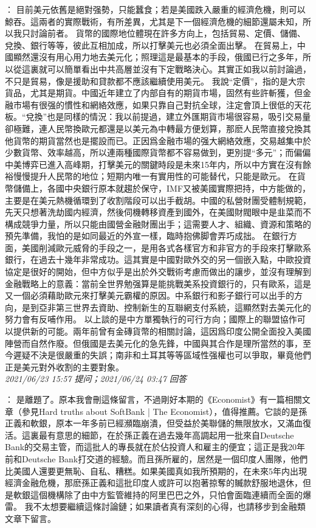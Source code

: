 \documentclass[twocolumn]{ctexart}
\begin{document}
：
目前美元依舊是絕對强勢，只能蠶食；若是美國跌入嚴重的經濟危機，則可以鯨吞。這兩者的實際戰術，有所差異，尤其是下一個經濟危機的細節還屬未知，所以我只討論前者。
貨幣的國際地位體現在許多方向上，包括貿易、定價、儲備、兌換、銀行等等，彼此互相加成，所以打擊美元也必須全面出擊。
在貿易上，中國顯然還沒有用心用力地去美元化；照理這是最基本的手段，俄國已行之多年，所以從這裏就可以簡單看出中共高層並沒有下定戰略決心。其實正如我以前討論過，不只是貿易，像是援助和貸款都不應該繼續使用美元。
我說“定價”，指的是大宗貨品，尤其是期貨。中國近年建立了内部自有的期貨市場，固然有些許斬獲，但金融市場有很强的慣性和網絡效應，如果只靠自己對抗全球，注定會頂上很低的天花板。“兌換”也是同樣的情況：我以前提過，建立外匯期貨市場很容易，吸引交易量卻極難，連人民幣換歐元都還是以美元為中轉最方便划算，那麽人民幣直接兌換其他貨幣的期貨當然也是擺設而已。正因爲金融市場的强大網絡效應，交易越集中於少數貨幣、效率越高，所以連兩種國際貨幣都不容易做到，更別提“多元”；而偏偏中美博弈已進入高峰期，打擊美元的關鍵時段是未來15年内，所以中方實在沒有餘裕慢慢提升人民幣的地位；短期内唯一有實用性的可能替代，只能是歐元。
在貨幣儲備上，各國中央銀行原本就趨於保守，IMF又被美國實際把持，中方能做的，主要是在美元熱機循環到了收割階段可以出手截胡。中國的私營財團受體制規範，先天只想著洗劫國内經濟，然後伺機轉移資產到國外，在美國財閥眼中是韭菜而不構成競爭力量，所以只能由國營金融財團出手；這需要人才、組織、資源和策略的預先準備，我怕的是如同最近的外宣一樣，臨時抱佛脚會弄巧成拙。
在銀行方面，美國削減歐元威脅的手段之一，是用各式各樣官方和非官方的手段來打擊歐系銀行，在過去十幾年非常成功。這其實是中國對歐外交的另一個嵌入點，中歐投資協定是很好的開始，但中方似乎是出於外交戰術考慮而做出的讓步，並沒有理解到金融戰略上的意義：當前全世界勉强算是能挑戰美系投資銀行的，只有歐系，這是又一個必須藉助歐元來打擊美元霸權的原因。中系銀行和影子銀行可以出手的方向，是到亞非第三世界去資助、控制新生的互聯網支付系統，這顯然對去美元化的努力會有反哺作用。
以上談的是中方單獨執行的可行方向；國際上的聯盟協作可以提供新的可能。兩年前曾有金磚貨幣的相關討論，這因爲印度公開全面投入美國陣營而自然作廢。但俄國是去美元化的急先鋒，中國與其合作是理所當然的事，至今遲疑不決是很嚴重的失誤；南非和土耳其等等區域性强權也可以爭取，畢竟他們正是美元對外收割的主要對象。
\\

\textit{\hfill\noindent\small 2021/06/23 15:57 提问；2021/06/24 03:47 回答}

：
是離題了。原本我會刪這條留言，不過剛好本期的《Economist》有一篇相關文章（參見Hard truths about SoftBank | The Economist），值得推薦。它談的是孫正義和軟銀，原本一年多前已經瀕臨崩潰，但受益於美聯儲的無限放水，又滿血復活。這裏最有意思的細節，在於孫正義在過去幾年高調起用一批來自Deutsche Bank的交易主管，而這批人的專長就在於佔投資人和雇主的便宜；這正是我20年前和Deutsche Bank打交道的經驗。而且孫所雇的，居然是一個印度人團隊，他們比美國人還要更無恥、自私、糟糕。如果美國真如我所預期的，在未來5年内出現經濟金融危機，那麽孫正義和這批印度人或許可以抱著掠奪的贓款舒服地退休，但是軟銀這個機構除了由中方監管維持的阿里巴巴之外，只怕會面臨連續而全面的爆雷。
我不太想要繼續這條討論鏈；如果讀者真有深刻的心得，也請移步到金融類文章下留言。
\\
\end{document}

